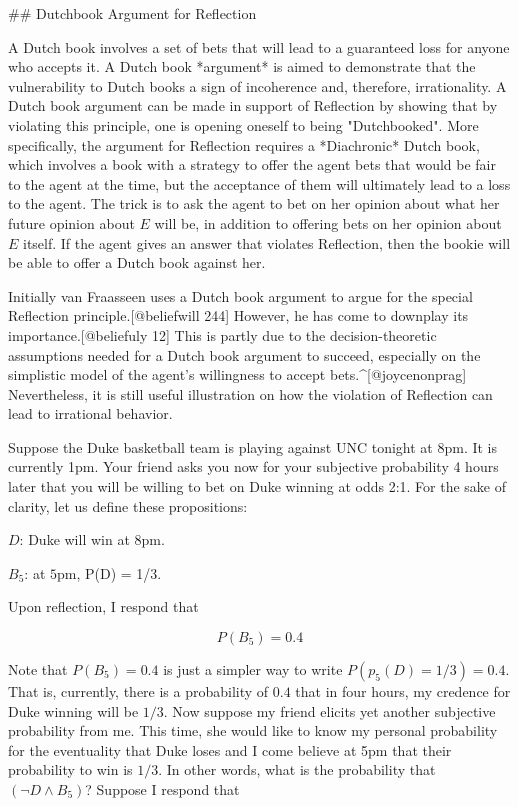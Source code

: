 \#\# Dutchbook Argument for Reflection

A Dutch book involves a set of bets that will lead to a guaranteed loss
for anyone who accepts it. A Dutch book *argument* is aimed to
demonstrate that the vulnerability to Dutch books a sign of incoherence
and, therefore, irrationality. A Dutch book argument can be made in
support of Reflection by showing that by violating this principle, one
is opening oneself to being "Dutchbooked". More specifically, the
argument for Reflection requires a *Diachronic* Dutch book, which
involves a book with a strategy to offer the agent bets that would be
fair to the agent at the time, but the acceptance of them will
ultimately lead to a loss to the agent. The trick is to ask the agent to
bet on her opinion about what her future opinion about \(E\) will be, in
addition to offering bets on her opinion about \(E\) itself. If the
agent gives an answer that violates Reflection, then the bookie will be
able to offer a Dutch book against her.

Initially van Fraasseen uses a Dutch book argument to argue for the
special Reflection principle.{[}@beliefwill 244{]} However, he has come
to downplay its importance.{[}@beliefuly 12{]} This is partly due to the
decision-theoretic assumptions needed for a Dutch book argument to
succeed, especially on the simplistic model of the agent's willingness
to accept bets.\^{}{[}@joycenonprag{]} Nevertheless, it is still useful
illustration on how the violation of Reflection can lead to irrational
behavior.

Suppose the Duke basketball team is playing against UNC tonight at 8pm.
It is currently 1pm. Your friend asks you now for your subjective
probability 4 hours later that you will be willing to bet on Duke
winning at odds 2:1. For the sake of clarity, let us define these
propositions:

\(D\): Duke will win at 8pm.

\(B_{5}\): at \(5\)pm, P(D) = 1/3.

Upon reflection, I respond that

\[P(B_5) = 0.4\]

Note that \(P(B_5) = 0.4\) is just a simpler way to write
\(P(p_5(D)=1/3) = 0.4\). That is, currently, there is a probability of
\(0.4\) that in four hours, my credence for Duke winning will be
\(1/3\). Now suppose my friend elicits yet another subjective
probability from me. This time, she would like to know my personal
probability for the eventuality that Duke loses and I come believe at
5pm that their probability to win is \(1/3\). In other words, what is
the probability that \((\neg D \wedge B_{5})\)? Suppose I respond that

